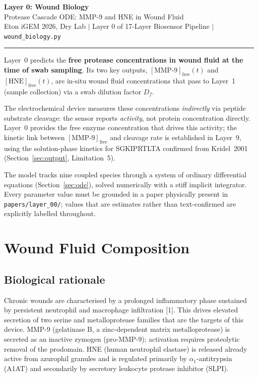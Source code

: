 \documentclass[10pt,a4paper]{article}
\numberwithin{equation}{section}
\newcommand{\cit}[1]{[#1]}   %
\begin{document}
\begin{center}
{\LARGE\bfseries Layer 0: Wound Biology}\\[0.4em]
{\large Protease Cascade ODE: MMP-9 and HNE in Wound Fluid}\\[0.25em]
{\small\color{gray} Eton iGEM 2026, Dry Lab \quad$|$\quad
Layer 0 of 17-Layer Biosensor Pipeline \quad$|$\quad
\texttt{wound\_biology.py}}
\end{center}
\vspace{0.4em}\hrule\vspace{0.7em}

\noindent
Layer~0 predicts the \textbf{free protease concentrations in wound fluid at the
time of swab sampling}. Its two key outputs, $[\text{MMP-9}]_{\text{free}}(t)$
and $[\text{HNE}]_{\text{free}}(t)$, are in-situ wound fluid concentrations that
pass to Layer~1 (sample collection) via a swab dilution factor $D_f$.

The electrochemical device measures these concentrations \emph{indirectly} via peptide
substrate cleavage: the sensor reports \emph{activity}, not protein concentration
directly. Layer~0 provides the free enzyme concentration that drives this activity;
the kinetic link between $[\text{MMP-9}]_{\text{free}}$ and cleavage rate is
established in Layer~9, using the solution-phase kinetics for SGKIPRTLTA confirmed
from Kridel~2001 (Section~\ref{sec:output}, Limitation~5).

The model tracks nine coupled species through a system of ordinary differential
equations (Section~\ref{sec:ode}), solved numerically with a stiff implicit integrator.
Every parameter value must be grounded in a paper physically present in
\texttt{papers/layer\_00/}; values that are estimates rather than text-confirmed
are explicitly labelled throughout.

\section{Wound Fluid Composition}
\label{sec:composition}

\subsection{Biological rationale}

Chronic wounds are characterised by a prolonged inflammatory phase sustained by
persistent neutrophil and macrophage infiltration \cit{1}. This drives elevated
secretion of two serine and metalloprotease families that are the targets of this
device. MMP-9 (gelatinase B, a zinc-dependent matrix metalloprotease) is secreted as
an inactive zymogen (pro-MMP-9); activation requires proteolytic removal of the
prodomain. HNE (human neutrophil elastase) is released already active from azurophil
granules and is regulated primarily by $\alpha_1$-antitrypsin (A1AT) and secondarily
by secretory leukocyte protease inhibitor (SLPI).
\end{document}
